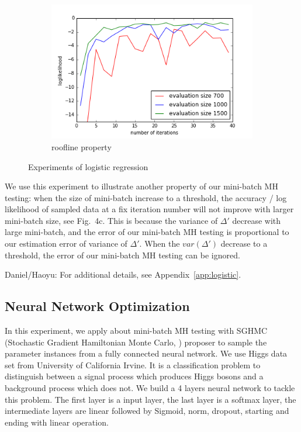 \documentclass{article}
\begin{document}
\begin{figure}[t]
\begin{subfigure}[b]{0.32\textwidth}
        \includegraphics[width=\textwidth]{./figures/roofline_hyc.png}
        \caption{roofline property}
        \label{fig:logistic_roof}
    \end{subfigure}
    \caption{Experiments of logistic regression}\label{fig:logistic}
\end{figure}

We use this experiment to illustrate another property of our mini-batch MH testing: when the size of
mini-batch increase to a threshold, the accuracy / log likelihood of sampled data at a fix iteration
number will not improve with larger mini-batch size, see Fig.~4c. This is because the variance of
$\Delta'$ decrease with large mini-batch, and the error of our mini-batch MH testing is proportional
to our estimation error of variance of $\Delta'$. When the $var(\Delta')$ decrease to a threshold,
the error of our mini-batch MH testing can be ignored.  

{\color{blue}
Daniel/Haoyu: For additional details, see Appendix~\ref{app:logistic}.
}

\subsection{Neural Network Optimization}\label{ssec:nets}

In this experiment, we apply about mini-batch MH testing with SGHMC (Stochastic Gradient Hamiltonian Monte Carlo, \cite{sghmc_2014}) proposer to sample the parameter instances from a fully connected neural network. We use Higgs data set from University of California Irvine. It is a classification problem to distinguish between a signal process which produces Higgs bosons and a background process which does not. We build a 4 layers neural network to tackle this problem. The first layer is a input layer, the last layer is a softmax layer, the intermediate layers are linear followed by Sigmoid, norm, dropout, starting and ending with linear operation. 
\end{document}
